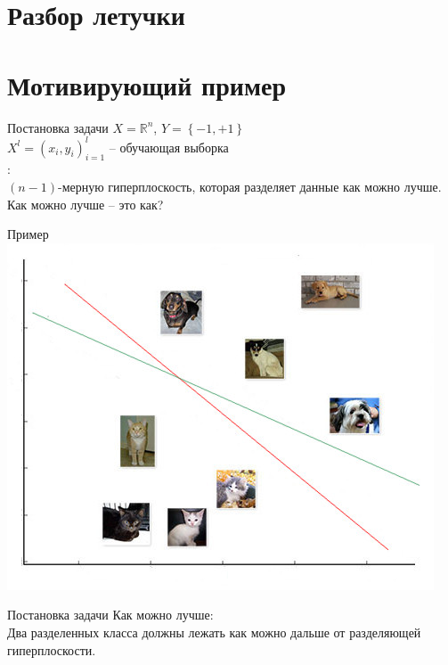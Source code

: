 \documentclass[12pt]{beamer}
\subtitle{Лекция 8. Метод опорных векторов.}
\begin{document}
	

\section{Разбор летучки}

\frame{\titlepage}

\section{Мотивирующий пример}

\begin{frame}{Постановка задачи}
	$X = \mathbb{R}^n$, ${Y = \left\{ -1, + 1\right\}}$\\
	${X^l = (x_i, y_i)_{i = 1}^l}$ -- обучающая выборка\\
	:\\
	$(n-1)$-мерную гиперплоскость, которая разделяет данные как можно лучше.
	\\ \bigbreak
	Как можно лучше -- это как?
\end{frame}

\begin{frame}{Пример}
  \centering
  \includegraphics[width=0.9 \textwidth, keepaspectratio]{images/catdog}
\end{frame}

\begin{frame}{Постановка задачи}
	Как можно лучше:\\
	Два разделенных класса должны лежать как можно дальше от разделяющей гиперплоскости.\\
\end{frame}
\end{document}
